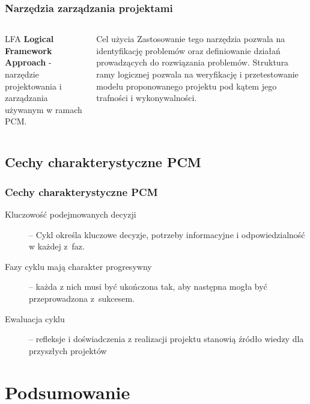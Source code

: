 \documentclass{beamer}
\begin{document}
\begin{frame}\frametitle{Narzędzia zarządzania projektami}
    \begin{columns}
    
        	\centering
        	
        	\begin{block}{LFA}
                \textbf{Logical Framework Approach} - narzędzie projektowania i zarządzania używanym w ramach PCM.
            \end{block}
        
    		\centering
    		
    		\begin{exampleblock}{Cel użycia}
    	        Zastosowanie tego narzędzia pozwala na identyfikację problemów oraz definiowanie działań prowadzących do rozwiązania problemów. Struktura ramy logicznej pozwala na weryfikację i przetestowanie modelu proponowanego projektu pod kątem jego trafności i wykonywalności.
            \end{exampleblock}
			
	\end{columns}
	
\end{frame}

\subsection{Cechy charakterystyczne PCM}

\begin{frame}\frametitle{Cechy charakterystyczne PCM}
    \begin{description}
            \item [Kluczowość podejmowanych decyzji] – Cykl określa kluczowe decyzje, potrzeby informacyjne i odpowiedzialność w każdej z faz. 
            \item [Fazy cyklu mają charakter progresywny] – każda z nich musi być ukończona tak, aby następna mogła być przeprowadzona z sukcesem. 
            \item [Ewaluacja cyklu] – refleksje i doświadczenia z realizacji projektu stanowią źródło wiedzy dla przyszłych projektów
        \end{description}
	
\end{frame}


\section{Podsumowanie}
\end{document}
